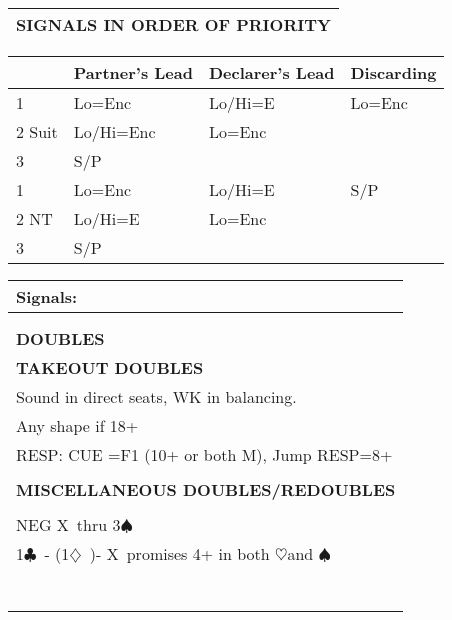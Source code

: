 \documentclass{article}
\newcommand\C{\ensuremath{\clubsuit}}
\newcommand\D{\ensuremath{\diamondsuit}}
\renewcommand\H{\ensuremath{\heartsuit}}
\renewcommand\S{\ensuremath{\spadesuit}}
\newcommand\X{{\footnotesize X}}
\begin{document}
\begin{minipage}{90mm}
\begin{tabular}{| p{88mm} |}
		\textbf{SIGNALS IN ORDER OF PRIORITY} \\ \hline
	\end{tabular}
	\begin{tabular}{| p{8.9mm} | p{22mm} | p{22mm} | p{22mm} |}
		       & Partner's Lead & Declarer's Lead & Discarding \\ \hline
		1      &Lo=Enc          & Lo/Hi=E         & Lo=Enc \\ \hline
		2 Suit &Lo/Hi=Enc       & Lo=Enc          & \\ \hline
		3      &S/P             &                 & \\ \hline
		1      &Lo=Enc          & Lo/Hi=E         & S/P \\ \hline
		2 NT   &Lo/Hi=E         & Lo=Enc          & \\ \hline
		3      &S/P             &                 & \\ \hline
	\end{tabular}
	\begin{tabular}{| p{88mm} |}
		Signals: \\ \hline
		\\ \hline
		\\ \hline \hline
		\cellcolor[gray]{0.9} \textbf{DOUBLES} \\ \hline
		\textbf{TAKEOUT DOUBLES} \\ \hline
                Sound in direct seats, WK in balancing. 
		\\ \hline
                Any shape if 18+
		\\ \hline
                RESP: CUE =F1 (10+ or both M), Jump RESP=8+  
		\\ \hline
		\\ \hline
		\textbf{MISCELLANEOUS DOUBLES/REDOUBLES} \\ \hline
		\\ \hline
                NEG \X\ thru 3\S\
		\\ \hline
                1\C\ - (1\D\ )- \X\ promises 4+ in both \H and \S
		\\ \hline
		\\ \hline
		\\ \hline
		\\ \hline
		\\ \hline
		\\ \hline
		\\ \hline
		\\ \hline
	\end{tabular}
\end{minipage}
\begin{minipage}{5mm}
	\begin{tabular}{| p{5mm} |}
	\end{tabular}
\end{minipage}
\end{document}
